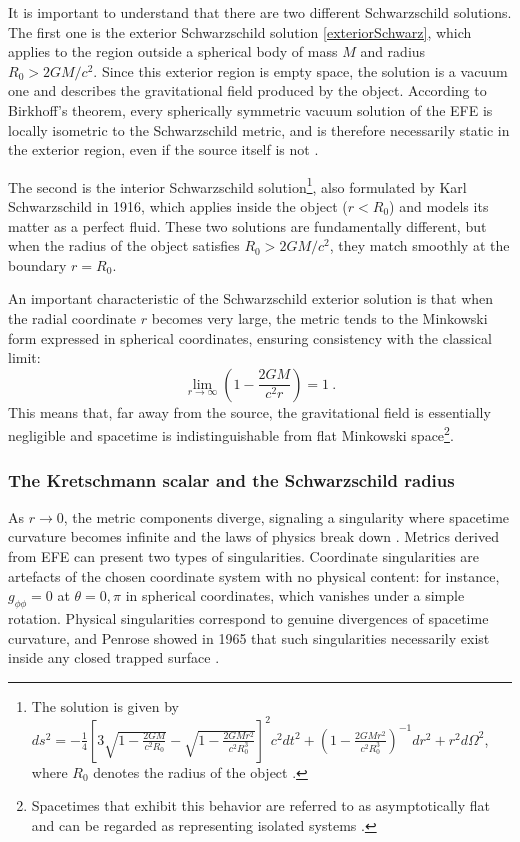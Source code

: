 It is important to understand that there are two different Schwarzschild solutions. 
The first one is the exterior Schwarzschild solution \eqref{exteriorSchwarz}, which applies to the region 
outside a spherical body of mass $M$ and radius $R_0 > 2GM/c^2$. Since this exterior region is
empty space, the solution is a vacuum one and describes the gravitational field produced 
by the object. According to Birkhoff's theorem, every spherically symmetric vacuum solution of the EFE is locally isometric to the Schwarzschild metric, and is therefore necessarily static in the exterior region, even if the source itself is not \cite{LlibreBertJanssen}.


The second is the interior Schwarzschild solution\footnote{The solution is given by
$ds^{2} = -\frac{1}{4} \left[ 3 \sqrt{1 - \frac{2GM}{c^2 R_{0}}}
- \sqrt{1 - \frac{2GM r^{2}}{c^2 R_{0}^{3}}} \right]^{2} c^2 dt^{2}
+ \left( 1 - \frac{2GMr^{2}}{c^2 R_{0}^{3}} \right)^{-1} dr^{2}
+ r^{2} d\Omega^{2}$, where $R_{0}$ denotes the radius of the object \cite{interior_Schwarzschild_solution}.}, also formulated by Karl
Schwarzschild in 1916, which applies inside the object ($r < R_0$) and models its matter
as a perfect fluid. These two solutions are fundamentally different, but when the radius
of the object satisfies $R_0 > 2GM/c^2$, they match smoothly at the boundary $r = R_0$.

An important characteristic of the Schwarzschild exterior solution is that when the radial coordinate $r$ becomes very large, the metric tends to the Minkowski form expressed in spherical coordinates, ensuring consistency with the classical limit:
\begin{equation}
    \lim_{r \to \infty} \left( 1 - \frac{2GM}{c^2 r} \right) = 1 \ .
\end{equation}
This means that, far away from the source, the gravitational field is essentially negligible and spacetime is indistinguishable from flat Minkowski space\footnote{Spacetimes that exhibit this behavior are referred to as asymptotically flat and can be regarded as representing isolated systems \cite{Llibre_Peter_Collier_unacosadificildecomprender}.}.

\subsubsection{The Kretschmann scalar and the Schwarzschild radius}

As $r \to 0$, the metric components diverge, signaling a singularity where spacetime curvature becomes infinite and the laws of physics break down \cite{SchwarzschildSolutionlimit}. Metrics derived from 
EFE can present two types of singularities. Coordinate singularities are artefacts of the chosen coordinate system with no physical content: for instance, $g_{\phi\phi} = 0$ at $\theta = 0, \pi$ in spherical coordinates, which vanishes under a simple rotation. Physical singularities correspond to genuine divergences of spacetime curvature, 
and Penrose showed in 1965 that such singularities necessarily exist inside any closed trapped surface \cite{Penrose1965}.

